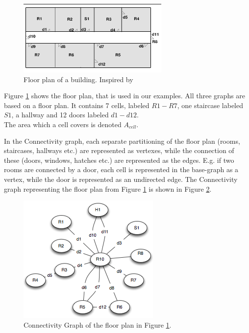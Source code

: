 \begin{figure}[]%
\centering
\includegraphics[width=0.8\columnwidth]{images/floorplan.png}%
\caption{Floor plan of a building. Inspired by~\cite{Jensen:2009:GMB:1590953.1591000}}%
\label{fig:floortplan}%
\end{figure}%

Figure \ref{fig:floortplan} shows the floor plan, that is used in our examples.
All three graphs are based on a floor plan. 
It contains 7 cells, labeled $R1 - R7$, one staircase labeled $S1$, a hallway and 12 doors labeled $d1-d12$. \\
The area which a cell covers is denoted $A_{cell}$.

In the Connectivity graph, each separate partitioning of the floor plan (rooms, staircases, hallways etc.) are represented as vertexes, while the connection of these (doors, windows, hatches etc.) are represented as the edges.
E.g. if two rooms are connected by a door, each cell is represented in the base-graph as a vertex, while the door is represented as an undirected edge. 
The Connectivity graph representing the floor plan from Figure \ref{fig:floortplan} is shown in Figure \ref{fig:connectivitygraph}. 

\begin{figure}[]%
\centering
\includegraphics[width=0.8\columnwidth]{images/connectivitygraph.png}%
\caption{Connectivity Graph of the floor plan in Figure \ref{fig:floortplan}.}%
\label{fig:connectivitygraph}%
\end{figure}%

